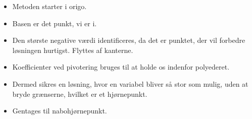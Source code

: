 \begin{frame}
\begin{itemize}


\item Metoden starter i origo.
\item Basen er det punkt, vi er i.
\item Den største negative værdi identificeres, da det er punktet, der vil forbedre løsningen hurtigst. Flyttes af kanterne. 
\item Koefficienter ved pivotering bruges til at holde os indenfor polyederet.
\item  Dermed sikres en løsning, hvor en variabel bliver så stor som mulig, uden at bryde grænserne, hvilket er et hjørnepunkt.
\item Gentages til nabohjørnepunkt.
\end{itemize}
\end{frame}